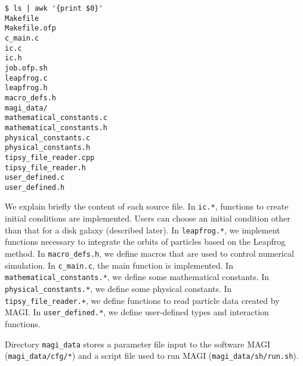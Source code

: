 \endifFtn
\ifC %
\begin{screen}
\begin{verbatim}
$ ls | awk '{print $0}'
Makefile
Makefile.ofp
c_main.c
ic.c
ic.h
job.ofp.sh
leapfrog.c
leapfrog.h
macro_defs.h
magi_data/
mathematical_constants.c
mathematical_constants.h
physical_constants.c
physical_constants.h
tipsy_file_reader.cpp
tipsy_file_reader.h
user_defined.c
user_defined.h
\end{verbatim}
\end{screen}
We explain briefly the content of each source file. In \texttt{ic.*}, functions to create initial conditions are implemented. Users can choose an initial condition other than that for a disk galaxy (described later). In \texttt{leapfrog.*}, we implement functions necessary to integrate the orbits of particles based on the Leapfrog method. In \texttt{macro\_defs.h}, we define macros that are used to control numerical simulation. In \texttt{c\_main.c}, the main function is implemented. In \texttt{mathematical\_constants.*}, we define some mathematical constants. In \texttt{physical\_constants.*}, we define some physical constants. In \texttt{tipsy\_file\_reader.+}, we define functions to read particle data created by \textsc{MAGI}. In \texttt{user\_defined.*}, we define user-defined types and interaction functions.
\endifC

Directory \texttt{magi\_data} stores a parameter file input to the software \textsc{MAGI} (\texttt{magi\_data/cfg/*}) and a script file used to run \textsc{MAGI} (\texttt{magi\_data/sh/run.sh}).

